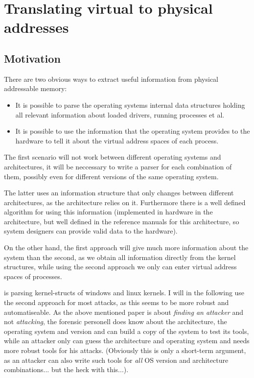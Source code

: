 %
%

\section{Translating virtual to physical addresses}

\subsection{Motivation}

There are two obvious ways to extract useful information from physical
addressable memory:

\begin{itemize}

	\item It is possible to parse the operating systems internal data
	structures holding all relevant information about loaded drivers,
	running processes et al.
	
	\item It is possible to use the information that the operating system
	provides to the hardware to tell it about the virtual address spaces of
	each process.
	
\end{itemize}

The first scenario will not work between different operating systems and
architectures, it will be neccessary to write a parser for each combination of
them, possibly even for different versions of the same operating system.

The latter uses an information structure that only changes between different
architectures, as the architecture relies on it. Furthermore there is a well
defined algorithm for using this information (implemented in hardware in the
architecture, but well defined in the reference manuals for this architecture,
so system designers can provide valid data to the hardware).

On the other hand, the first approach will give much more information about the
system than the second, as we obtain all information directly from the kernel
structures, while using the second approach we only can enter virtual address
spaces of processes.

\cite{finding_digital_evidence_in_physical_memory:2006} is parsing
kernel-structs of windows and linux kernels. I will in the following use the
second approach for most attacks, as this seems to be more robust and
automatiseable. As the above mentioned paper is about \emph{finding an attacker}
and not \emph{attacking}, the forensic personell does know about the
architecture, the operating system and version and can build a copy of the
system to test its tools, while an attacker only can guess the architecture and
operating system and needs more robust tools for his attacks.  (Obviously this
is only a short-term argument, as an attacker can also write such tools for
\emph{all} OS version and architecture combinations... but the heck with
this...).

